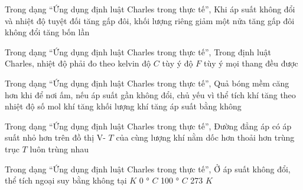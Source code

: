 \begin{ex}
Trong dạng “Ứng dụng định luật Charles trong thực tế”, Khi áp suất không đổi và nhiệt độ tuyệt đối tăng gấp đôi, khối lượng riêng
\choice
{\True giảm một nửa}
{tăng gấp đôi}
{không đổi}
{tăng bốn lần}
\end{ex}

\begin{ex}
Trong dạng “Ứng dụng định luật Charles trong thực tế”, Trong định luật Charles, nhiệt độ phải đo theo
\choice
{\True kelvin}
{độ $C$ tùy ý}
{độ $F$ tùy ý}
{mọi thang đều được}
\end{ex}

\begin{ex}
Trong dạng “Ứng dụng định luật Charles trong thực tế”, Quả bóng mềm căng hơn khi để nơi ấm, nếu áp suất gần không đổi, chủ yếu vì
\choice
{\True thể tích khí tăng theo nhiệt độ}
{số mol khí tăng}
{khối lượng khí tăng}
{áp suất bằng không}
\end{ex}

\begin{ex}
Trong dạng “Ứng dụng định luật Charles trong thực tế”, Đường đẳng áp có áp suất nhỏ hơn trên đồ thị V- $T$ của cùng lượng khí nằm
\choice
{\True dốc hơn}
{thoải hơn}
{trùng trục $T$}
{luôn trùng nhau}
\end{ex}

\begin{ex}
Trong dạng “Ứng dụng định luật Charles trong thực tế”, Ở áp suất không đổi, thể tích ngoại suy bằng không tại
\choice
{ $K$}
{0 ° $C$}
{100 ° $C$}
{273 $K$}
\end{ex}
